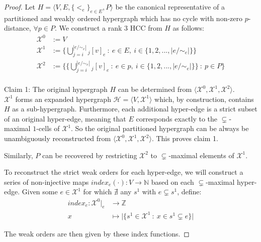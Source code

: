 \documentclass{article}
\theoremstyle{plain}
\theoremstyle{definition}
\theoremstyle{remark}
\newcommand{\cX}{\mathcal{X}}
\begin{document}
\begin{proof}
	Let $H = \big\langle V, E, \{<_e\}_{e \in E}, P \big\rangle$ be the canonical representative of a partitioned and weakly ordered hypergraph which has no cycle with non-zero $p$-distance, $\forall p \in P$. We construct a rank $3$ HCC from $H$ as follows:
	\begin{equation*}
		\begin{aligned}
			\cX^0 &:= V\\
			\cX^1 &:= \Bigg\{ \bigcup_{j = i}^{|e / \sim_e|} {}_j[v]_e \ : \ e \in E, \ i \in \big\{1, 2, ..., |e / \sim_e|\big\} \Bigg\}\\
			\cX^2 &:= \Bigg\{ \Big\{ \bigcup_{j = i}^{|e / \sim_e|} {}_j[v]_e \ : \ e \in p, \ i \in \big\{1, 2, ..., |e / \sim_e|\big\} \Big\} \ : \ p \in P \Bigg\}\\
		\end{aligned}
	\end{equation*}
	
	Claim 1: The original hypergraph $H$ can be determined from $\langle \cX^0, \cX^1, \cX^2 \rangle$.\\
	$\cX^1$ forms an expanded hypergraph $\mathcal{H} = \langle V, \cX^1 \rangle$ which, by construction, contains $H$ as a sub-hypergraph. Furthermore, each additional hyper-edge is a strict subset of an original hyper-edge, meaning that $E$ corresponds exactly to the $\subsetneq$-maximal $1$-cells of $\cX^1$. So the original partitioned hypergraph can be always be unambiguously reconstructed from $\langle \cX^0, \cX^1, \cX^2 \rangle$. This proves claim 1.
	
	Similarly, $P$ can be recovered by restricting $\cX^2$ to $\subsetneq$-maximal elements of $\cX^1$.
	
	To reconstruct the strict weak orders for each hyper-edge, we will construct a series of non-injective maps $index_e(\cdot): V \rightarrow \mathbb{N}$ based on each $\subsetneq$-maximal hyper-edge. Given some $e \in \cX^1$ for which $\nexists$ any $s^1$ with $e \subsetneq s^1$, define:
	\begin{equation*}
		\begin{aligned}
			index_e: \cX^0|_e &\rightarrow \mathbb{Z}\\
			x &\mapsto \bigg| \big\{ s^1 \in \cX^1 \ : \ x \in s^1 \subsetneq e \big\} \bigg|
		\end{aligned}
	\end{equation*}
	
	The weak orders are then given by these index functions.
	

\end{proof}
\end{document}
